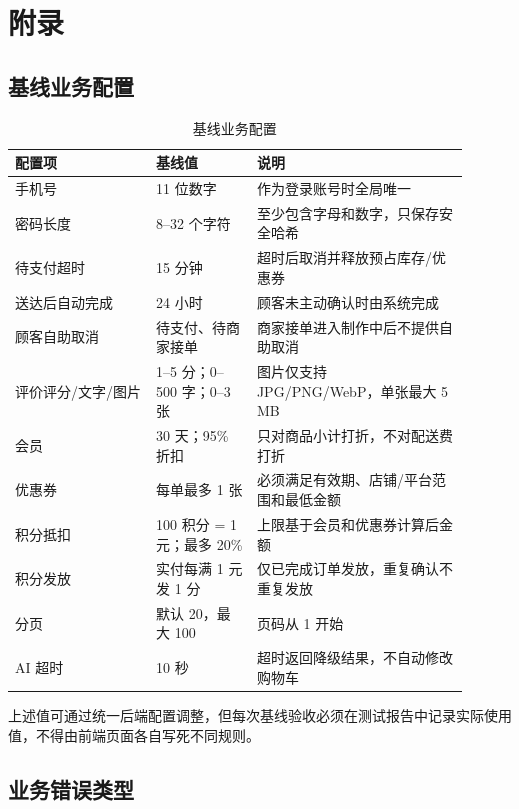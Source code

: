 \section{附录}

\subsection{基线业务配置}

\begin{longtable}{|L{0.28\linewidth}|L{0.20\linewidth}|L{0.42\linewidth}|}
\caption{基线业务配置}\label{tab:baseline-config}\\ \hline
\textbf{配置项} & \textbf{基线值} & \textbf{说明} \\ \hline
手机号 & 11 位数字 & 作为登录账号时全局唯一 \\ \hline
密码长度 & 8--32 个字符 & 至少包含字母和数字，只保存安全哈希 \\ \hline
待支付超时 & 15 分钟 & 超时后取消并释放预占库存/优惠券 \\ \hline
送达后自动完成 & 24 小时 & 顾客未主动确认时由系统完成 \\ \hline
顾客自助取消 & 待支付、待商家接单 & 商家接单进入制作中后不提供自助取消 \\ \hline
评价评分/文字/图片 & 1--5 分；0--500 字；0--3 张 & 图片仅支持 JPG/PNG/WebP，单张最大 5 MB \\ \hline
会员 & 30 天；95\% 折扣 & 只对商品小计打折，不对配送费打折 \\ \hline
优惠券 & 每单最多 1 张 & 必须满足有效期、店铺/平台范围和最低金额 \\ \hline
积分抵扣 & 100 积分 = 1 元；最多 20\% & 上限基于会员和优惠券计算后金额 \\ \hline
积分发放 & 实付每满 1 元发 1 分 & 仅已完成订单发放，重复确认不重复发放 \\ \hline
分页 & 默认 20，最大 100 & 页码从 1 开始 \\ \hline
AI 超时 & 10 秒 & 超时返回降级结果，不自动修改购物车 \\ \hline
\end{longtable}

上述值可通过统一后端配置调整，但每次基线验收必须在测试报告中记录实际使用值，不得由前端页面各自写死不同规则。

\subsection{业务错误类型}

